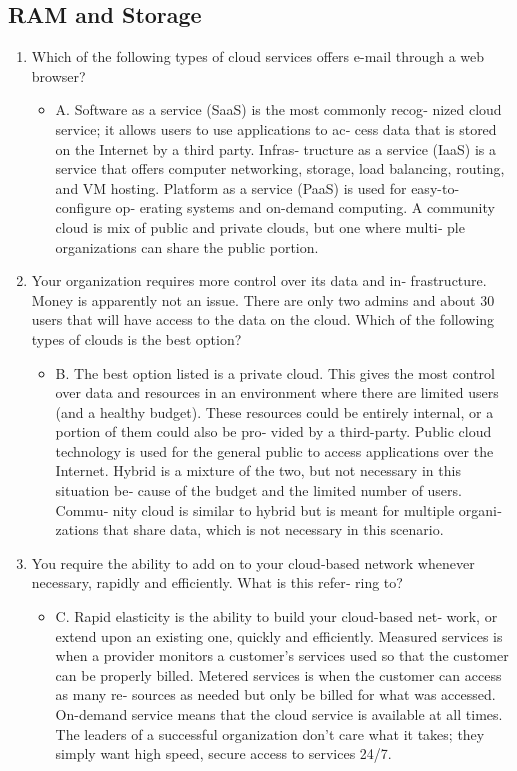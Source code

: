 \documentclass{article}
\begin{document}
\subsection{RAM and Storage} 
\begin{enumerate}
     \item Which of the following types of cloud services offers e-mail
through a web browser?
    \begin{itemize}
        \item A. Software as a service (SaaS) is the most commonly recog‐
nized cloud service; it allows users to use applications to ac‐
cess data that is stored on the Internet by a third party. Infras‐
tructure as a service (IaaS) is a service that offers computer
networking, storage, load balancing, routing, and VM hosting.
Platform as a service (PaaS) is used for easy-to-configure op‐
erating systems and on-demand computing. A community
cloud is mix of public and private clouds, but one where multi‐
ple organizations can share the public portion.
    \end{itemize}
    \item Your organization requires more control over its data and in‐
frastructure. Money is apparently not an issue. There are only
two admins and about 30 users that will have access to the data
on the cloud. Which of the following types of clouds is the best
option?
    \begin{itemize}
        \item B. The best option listed is a private cloud. This gives the most
control over data and resources in an environment where there
are limited users (and a healthy budget). These resources could
be entirely internal, or a portion of them could also be pro‐
vided by a third-party. Public cloud technology is used for the
general public to access applications over the Internet. Hybrid
is a mixture of the two, but not necessary in this situation be‐
cause of the budget and the limited number of users. Commu‐
nity cloud is similar to hybrid but is meant for multiple organi‐
zations that share data, which is not necessary in this scenario.
    \end{itemize}
    \item You require the ability to add on to your cloud-based network
whenever necessary, rapidly and efficiently. What is this refer‐
ring to?
    \begin{itemize}
        \item C. Rapid elasticity is the ability to build your cloud-based net‐
work, or extend upon an existing one, quickly and efficiently.
Measured services is when a provider monitors a customer’s
services used so that the customer can be properly billed.
Metered services is when the customer can access as many re‐
sources as needed but only be billed for what was accessed.
On-demand service means that the cloud service is available at
all times. The leaders of a successful organization don’t care
what it takes; they simply want high speed, secure access to
services 24/7.
    \end{itemize}
    
\end{enumerate}
\end{document}
